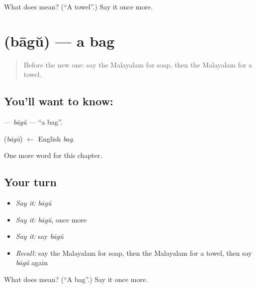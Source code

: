 \begin{tcolorbox}[breakable,colback=teal!4,colframe=teal!35!black,title={Before you move on}]
What does  mean? (\textquotedblleft{}A towel\textquotedblright{}.) Say it once more.
\end{tcolorbox}
\section[\texorpdfstring{\ml{ബാഗ്} (bāgŭ)}{ബാഗ് (bāgŭ)}]{ (bāgŭ) — a bag}

\label{lesson:ML-C147-bagu}



\begin{quote}
Before the new one: say the Malayalam for soap, then the Malayalam for a towel.
\end{quote}

\subsection*{You'll want to know: }
\textbf{} — \emph{bāgŭ} — \textquotedblleft{}a bag\textquotedblright{}.

\begin{cousinweb}
\textbf{} (\emph{bāgŭ}) $\leftarrow$ English \emph{bag}.
\end{cousinweb}

\begin{grammarlens}[title={What you've built}]
One more word for this chapter.
\end{grammarlens}

\subsection*{Your turn}
\begin{itemize}
\raggedright
  \item \emph{Say it:} \emph{bāgŭ}
  \item \emph{Say it:} \emph{bāgŭ}, once more
  \item \emph{Say it:} say \emph{bāgŭ}
  \item \emph{Recall:} say the Malayalam for soap, then the Malayalam for a towel, then say \emph{bāgŭ} again
\end{itemize}

\begin{tcolorbox}[breakable,colback=teal!4,colframe=teal!35!black,title={Before you move on}]
What does  mean? (\textquotedblleft{}A bag\textquotedblright{}.) Say it once more.
\end{tcolorbox}
